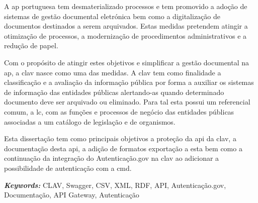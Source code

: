 A \acrlong{ap} portuguesa tem desmaterializado processos e tem promovido a adoção de sistemas de gestão documental eletrónica bem como a digitalização de documentos destinados a serem arquivados. Estas medidas pretendem atingir a otimização de processos, a modernização de procedimentos administrativos e a redução de papel.

Com o propósito de atingir estes objetivos e simplificar a gestão documental na \acrlong{ap}, a \acrfull{clav} nasce como uma das medidas. A \acrshort{clav} tem como finalidade a classificação e a avaliação da informação pública por forma a auxiliar os sistemas de informação das entidades públicas alertando-as quando determinado documento deve ser arquivado ou eliminado. Para tal esta possui um referencial comum, a \acrlong{lc}, com as funções e processos de negócio das entidades públicas associadas a um catálogo de legislação e de organismos.

Esta dissertação tem como principais objetivos a proteção da \acrshort{api} da \acrshort{clav}, a documentação desta \acrshort{api}, a adição de formatos exportação a esta bem como a continuação da integração do Autenticação.gov na \acrshort{clav} ao adicionar a possibilidade de autenticação com a \acrlong{cmd}.

\vspace{1cm}

\textit{\textbf{Keywords:}} CLAV, Swagger, CSV, XML, RDF, API, Autenticação.gov, Documentação, API Gateway, Autenticação

